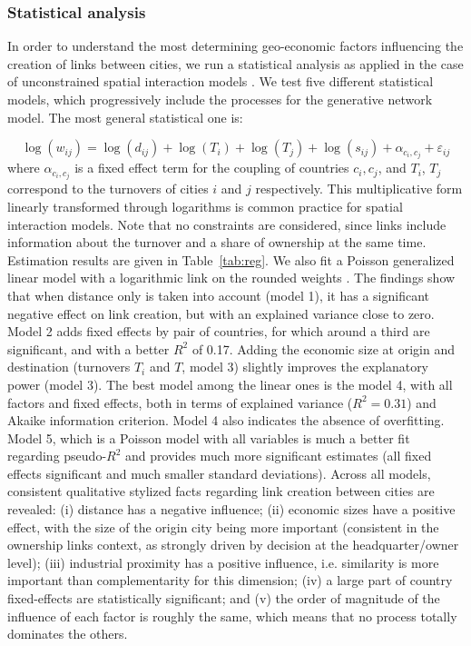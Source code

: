 \documentclass[10pt,letterpaper]{article}
\begin{document}
\subsubsection*{Statistical analysis}

In order to understand the most determining geo-economic factors influencing the creation of links between cities, we run a statistical analysis as applied in the case of unconstrained spatial interaction models \cite{wilson1975some}. We test five different statistical models, which progressively include the processes for the generative network model. The most general statistical one is:

\begin{equation}
\log(w_{ij}) = \log(d_{ij}) + \log(T_i) + \log(T_j) + \log(s_{ij}) + \alpha_{c_i,c_j} + \varepsilon_{ij}
\end{equation}
where $\alpha_{c_i,c_j}$ is a fixed effect term for the coupling of countries $c_i,c_j$, and $T_i$, $T_j$ correspond to the turnovers of cities $i$ and $j$ respectively. 
This multiplicative form linearly transformed through logarithms is common practice for spatial interaction models. Note that no constraints are considered, since links include information about the turnover and a share of ownership at the same time. 
Estimation results are given in Table~\ref{tab:reg}. We also fit a Poisson generalized linear model with a logarithmic link on the rounded weights \cite{flowerdew1988fitting}. The findings show that when distance only is taken into account (model 1), it has a significant negative effect on link creation, but with an explained variance close to zero. Model 2 adds fixed effects by pair of countries, for which around a third are significant, and with a better $R^2$ of 0.17. Adding the economic size at origin and destination (turnovers $T_i$ and $T$, model 3) slightly improves the explanatory power (model 3). The best model among the linear ones is the model 4, with all factors and fixed effects, both in terms of explained variance ($R^2 = 0.31$) and Akaike information criterion. Model 4 also indicates the absence of overfitting. Model 5, which is a Poisson model with all variables is much a better fit regarding pseudo-$R^2$ and provides much more significant estimates (all fixed effects significant and much smaller standard deviations). Across all models, consistent qualitative stylized facts regarding link creation between cities are revealed: (i) distance has a negative influence; (ii) economic sizes have a positive effect, with the size of the origin city being more important (consistent in the ownership links context, as strongly driven by decision at the headquarter/owner level); (iii) industrial proximity has a positive influence, i.e. similarity is more important than complementarity for this dimension; (iv) a large part of country fixed-effects are statistically significant; and (v) the order of magnitude of the influence of each factor is roughly the same, which means that no process totally dominates the others.
\end{document}
